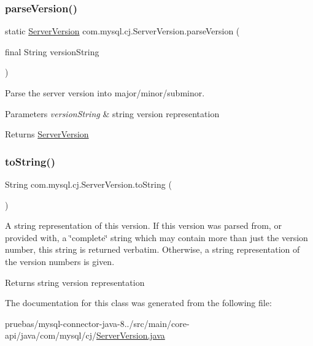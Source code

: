 \subsubsection{\texorpdfstring{parse\+Version()}{parseVersion()}}
{\footnotesize\ttfamily static \mbox{\hyperlink{classcom_1_1mysql_1_1cj_1_1_server_version}{Server\+Version}} com.\+mysql.\+cj.\+Server\+Version.\+parse\+Version (\begin{DoxyParamCaption}\item[{final String}]{version\+String }\end{DoxyParamCaption})\hspace{0.3cm}{\ttfamily [static]}}

Parse the server version into major/minor/subminor.


\begin{DoxyParams}{Parameters}
{\em version\+String} & string version representation \\
\hline
\end{DoxyParams}
\begin{DoxyReturn}{Returns}
\mbox{\hyperlink{classcom_1_1mysql_1_1cj_1_1_server_version}{Server\+Version}} 
\end{DoxyReturn}
\mbox{\label{classcom_1_1mysql_1_1cj_1_1_server_version_ac6732acde7ab4125a366f4c6d2f957f0}} 
\subsubsection{\texorpdfstring{to\+String()}{toString()}}
{\footnotesize\ttfamily String com.\+mysql.\+cj.\+Server\+Version.\+to\+String (\begin{DoxyParamCaption}{ }\end{DoxyParamCaption})}

A string representation of this version. If this version was parsed from, or provided with, a \char`\"{}complete\char`\"{} string which may contain more than just the version number, this string is returned verbatim. Otherwise, a string representation of the version numbers is given.

\begin{DoxyReturn}{Returns}
string version representation 
\end{DoxyReturn}


The documentation for this class was generated from the following file\+:\begin{DoxyCompactItemize}
\item 
pruebas/mysql-\/connector-\/java-\/8../src/main/core-\/api/java/com/mysql/cj/\mbox{\hyperlink{_server_version_8java}{Server\+Version.\+java}}\end{DoxyCompactItemize}
